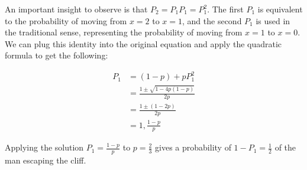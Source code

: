 \documentclass{article}
\begin{document}
An important insight to observe is that $P_2 = P_1P_1 = P_1^2$. The first 
$P_1$ is equivalent to the probability of moving from $x=2$ to $x=1$, and 
the second $P_1$ is used in the traditional sense, representing 
the probability of moving from $x=1$ to $x=0$. We can plug this 
identity into the original equation and apply the quadratic formula to get 
the following:

\begin{equation*}
\begin{split}
P_1 &= (1-p) + pP_1^2 \\ 
&= \frac{1 \pm \sqrt{1 - 4p(1-p)}}{2p} \\
&= \frac{1 \pm (1-2p)}{2p} \\
&= 1, \frac{1-p}{p}
\end{split}
\end{equation*}

Applying the solution $P_1 = \frac{1-p}{p}$ to $p=\frac{2}{3}$ 
gives a probability of $1-P_1 = \frac{1}{2}$ of the man escaping 
the cliff.
\end{document}
